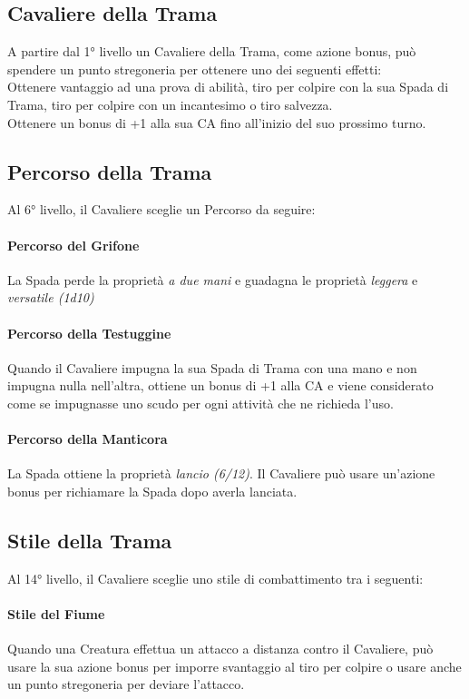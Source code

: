 \subsection{Cavaliere della Trama}

A partire dal 1° livello un Cavaliere della Trama, come azione bonus, può spendere un punto stregoneria per ottenere uno dei seguenti effetti: \\
Ottenere vantaggio ad una prova di abilità, tiro per colpire con la sua Spada di Trama, tiro per colpire con un incantesimo o tiro salvezza. \\
Ottenere un bonus di +1 alla sua CA fino all'inizio del suo prossimo turno.

\subsection{Percorso della Trama}

Al 6° livello, il Cavaliere sceglie un Percorso da seguire:
\paragraph{Percorso del Grifone} La Spada perde la proprietà \textit{a due mani} e guadagna le proprietà \textit{leggera} e \textit{versatile (1d10)}
\paragraph{Percorso della Testuggine} Quando il Cavaliere impugna la sua Spada di Trama con una mano e non impugna nulla nell'altra, ottiene un bonus di +1 alla CA e viene considerato come se impugnasse uno scudo per ogni attività che ne richieda l'uso.
\paragraph{Percorso della Manticora} La Spada ottiene la proprietà \textit{lancio (6/12)}. Il Cavaliere può usare un'azione bonus per richiamare la Spada dopo averla lanciata.

\subsection{Stile della Trama}
Al 14° livello, il Cavaliere sceglie uno stile di combattimento tra i seguenti:
\paragraph{Stile del Fiume} Quando una Creatura effettua un attacco a distanza contro il Cavaliere, può usare la sua azione bonus per imporre svantaggio al tiro per colpire o usare anche un punto stregoneria per deviare l'attacco.
